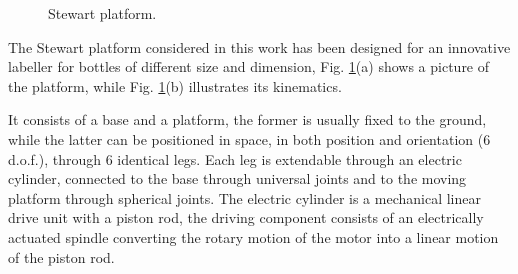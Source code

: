 \documentclass[]{interact}
\theoremstyle{plain}%
\theoremstyle{definition}
\theoremstyle{remark}
\begin{document}
{\begin{figure}
\caption{Stewart platform.} \label{Fig:Stewart_platform_picture}
\end{figure}
The Stewart platform considered in this work has been designed for an innovative labeller for bottles of different size and dimension, Fig. \ref{Fig:Stewart_platform_picture}(a) shows a picture of the platform, while Fig. \ref{Fig:Stewart_platform_picture}(b) illustrates its kinematics.

It consists of a base and a platform, the former is usually fixed to the ground, while the latter can be positioned in space, in both position and orientation (6 d.o.f.), through 6 identical legs. Each leg is extendable through an electric cylinder, connected to the base through universal joints and to the moving platform through spherical joints. The electric cylinder is a mechanical linear drive unit with a piston rod, the driving component consists of an electrically actuated spindle converting the rotary motion of the motor into a linear motion of the piston rod.

}
\end{document}
